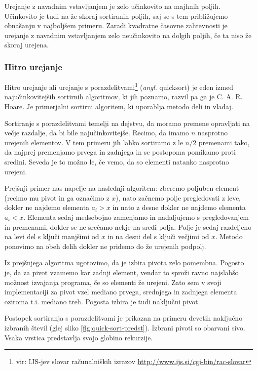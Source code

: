 \documentclass[a4paper,oneside]{article}
\begin{document}
Urejanje z navadnim vstavljanjem je zelo učinkovito na majhnih poljih. Učinkovito je tudi na že
skoraj sortiranih poljih, saj se s tem približujemo obnašanju v najboljšem primeru.
Zaradi kvadratne časovne zahtevnosti je urejanje z navadnim vstavljanjem zelo neučinkovito na
dolgih poljih, če ta niso že skoraj urejena.

\subsubsection{Hitro urejanje}
Hitro urejanje ali urejanje s porazdelitvami\footnote{vir: IJS-jev slovar računalniških izrazov
\url{http://www.ijs.si/cgi-bin/rac-slovar}} (\emph{angl.} quicksort) je eden izmed
najučinkovitejših sortirnih algoritmov, ki jih poznamo, razvil pa ga je C. A. R. Hoare.
Je primerjalni sortirni algoritem, ki uporablja metodo deli in vladaj.

Sortiranje s porazdelitvami temelji na dejstvu, da moramo premene opravljati na večje
razdalje, da bi bile najučinkovitejše. Recimo, da imamo $n$ nasprotno urejenih elementov.
V tem primeru jih lahko sortiramo z le $n/2$ premenami tako, da najprej premenjamo prvega
in zadnjega in se postopoma pomikamo proti sredini. Seveda je to možno le, če vemo, da so 
elementi natanko nasprotno urejeni.

Prejšnji primer nas napelje na naslednji algoritem: 
zberemo poljuben element (recimo mu pivot in ga označimo z $x$), nato začnemo 
polje pregledovati z leve, dokler ne najdemo elementa $a_i > x$ in nato z desne dokler ne 
najdemo elementa $a_i < x$. Elementa sedaj medsebojno zamenjamo in nadaljujemo s 
pregledovanjem in premenami, dokler se ne srečamo nekje na sredi polja.
Polje je sedaj razdeljeno na levi del s ključi manjšimi od $x$ in na desni del
s ključi večjimi od $x$. Metodo ponovimo na obeh delih dokler ne pridemo do že urejenih
podpolj. 

Iz prejšnjega algoritma ugotovimo, da je izbira pivota zelo
pomembna. Pogosto je, da za pivot vzamemo kar zadnji element, vendar to sproži ravno
najslabšo možnost izvajanja programa, če so elementi že urejeni. Zato sem v svoji
implementaciji za pivot vzel mediano prvega, srednjega in zadnjega elementa oziroma t.i.
mediano treh. Pogosta izbira je tudi naključni pivot. 

Postopek sortiranja s porazdelitvami je prikazan na primeru devetih naključno
izbranih števil (glej sliko \ref{fig:quick-sort-predst}). Izbrani pivoti so obarvani sivo.
Vsaka vrstica predstavlja svojo globino rekurzije.
\end{document}
